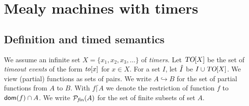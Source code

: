 \section{Mealy machines with timers}
\label{sec:mmt}

\subsection{Definition and timed semantics}
We assume an infinite set $X = \{ x_1, x_2, x_3,\ldots \}$ of {\em timers}.
Let $\mbox{\sl TO}[X]$ be the set of {\em timeout events} of the form
$\mathit{to}[x]$ for $x \in X$.
For a set $I$, let $\hat{I}$ be $I \cup \mbox{\sl TO}[X]$.
%
We view (partial) functions as sets of pairs.
We write $A \hookrightarrow B$ for the set of partial functions from $A$ to $B$.
With $f \lceil A$ we denote the restriction of function $f$ to ${\textsf{dom}}(f) \cap A$.
We write ${\mathcal{P}}_{\mathit{fin}}(A)$ for the set of finite subsets of set $A$.

